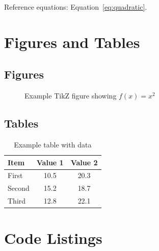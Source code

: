 \documentclass[
    language=english,
    doctype=book,              %
    institution=none,        %
    oneside,                 %
    loadGlossaries=true,          %
]{../../omnilatex}
\begin{document}
Reference equations: Equation~\eqref{eq:quadratic}.

\chapter{Figures and Tables}

\section{Figures}

\begin{figure}[htbp]
	\centering
	\caption{Example TikZ figure showing $f(x) = x^2$}
	\label{fig:example}
\end{figure}


\section{Tables}

\begin{table}[htbp]
	\centering
	\caption{Example table with data}
	\label{tab:example}
	\begin{tabular}{lcc}
		\toprule
		\textbf{Item} & \textbf{Value 1} & \textbf{Value 2} \\
		\midrule
		First         & 10.5             & 20.3             \\
		Second        & 15.2             & 18.7             \\
		Third         & 12.8             & 22.1             \\
		\bottomrule
	\end{tabular}
\end{table}

\chapter{Code Listings}
\end{document}
